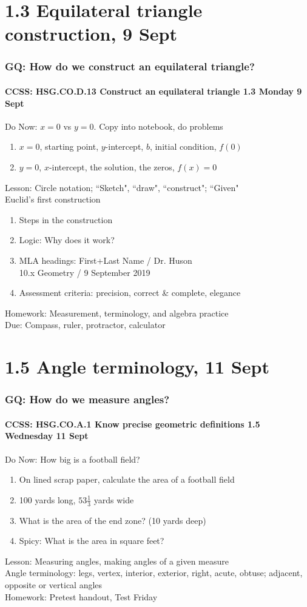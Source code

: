 \documentclass{beamer}
\begin{document}
\section{1.3 Equilateral triangle construction, 9 Sept}
\frame
{
  \frametitle{GQ: How do we construct an equilateral triangle?}
  \framesubtitle{CCSS: HSG.CO.D.13 Construct an equilateral triangle \hfill \alert{1.3 Monday 9 Sept}}

  \begin{block}{Do Now: $x=0$ vs $y=0$. Copy into notebook, do problems}
  \begin{enumerate}
      \item $x=0$, starting point, $y$-intercept, $b$, initial condition, $f(0)$
      \item $y=0$, $x$-intercept, the solution, the zeros, $f(x)=0$
  \end{enumerate}
  \end{block}
  Lesson: Circle notation; ``Sketch", ``draw", ``construct"; ``Given"\\[5pt]
  Euclid's first construction
  \begin{enumerate}
      \item Steps in the construction
      \item Logic: Why does it work?
      \item MLA headings: First+Last Name / Dr. Huson \\
      10.x Geometry / 9 September 2019
      \item Assessment criteria: precision, correct \& complete, elegance
  \end{enumerate}
  Homework: Measurement, terminology, and algebra practice\\
  Due: Compass, ruler, protractor, calculator
}

\section{1.5 Angle terminology, 11 Sept}
  \frame
  {
    \frametitle{GQ: How do we measure angles?}
    \framesubtitle{CCSS: HSG.CO.A.1 Know precise geometric definitions \hfill \alert{1.5 Wednesday 11 Sept}}
 
    \begin{block}{Do Now: How big is a football field?}
      \begin{enumerate}
          \item On lined scrap paper, calculate the area of a football field
          \item 100 yards long, $53 \frac{1}{3}$ yards wide
          \item What is the area of the end zone? (10 yards deep)
          \item Spicy: What is the area in square feet?
      \end{enumerate}
      \end{block}
    Lesson: Measuring angles, making angles of a given measure\\
    Angle terminology: legs, vertex, interior, exterior, right, acute, obtuse; adjacent, opposite or vertical angles\\ \vspace{0.5cm}
    Homework: Pretest handout, \alert{Test Friday}
  }
    
\end{document}
